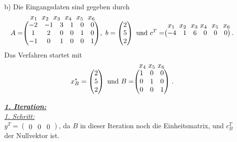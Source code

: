\documentclass [a4paper,11pt]{article}
\begin{document}
\begin{enumerate}
\begin{enumerate}
        \item[b)]
            Die Eingangsdaten sind gegeben durch
            \begin{align*}
                A =
                \stackrel{\mbox{$ \ x_1\ \ x_2\ \ x_3\ \ x_4\ \ x_5\ \ x_6$}}{%
                    \begin{pmatrix}
                        -2 & -1 & 3 & 1 & 0 & 0\\
                         1 & 2 & 0 & 0 & 1 & 0\\
                         -1 & 0 & 1 & 0 & 0 & 1
                    \end{pmatrix}
                  },\ b = 
                \begin{pmatrix}
                    2\\
                    5\\
                    2
                \end{pmatrix}\ \text{und}\ c^T =
                \stackrel{\mbox{$x_1\ \ x_2\ \ x_3\ x_4\ \ x_5\ \ x_6$}}{
                    \begin{pmatrix}
                       -4 & 1 & 6 & 0 & 0 & 0
                    \end{pmatrix}\text{.}
                }
            \end{align*}
            Das Verfahren startet mit
            \begin{align*}
                x^*_B =
                \begin{pmatrix}
                    2\\
                    5\\
                    2
                \end{pmatrix}\ \text{und}\ B =
                \stackrel{\mbox{$ x_4\ x_5\ x_6 $}}{
                    \begin{pmatrix}
                        1 & 0 & 0\\
                        0 & 1 & 0\\
                        0 & 0 & 1
                    \end{pmatrix}
                }
                \text{.}
            \end{align*}

            \newpage

            \underline{\textbf{\textit{1. Iteration:}}}\\
            \underline{\textit{1. Schritt:}}\\
            $y^T = \begin{pmatrix} 0 & 0 & 0 \end{pmatrix}$, da $B$ in dieser Iteration noch die Einheitsmatrix, und $c^T_B$ der Nullvektor ist.\\


\end{enumerate}
\end{enumerate}
\end{document}
